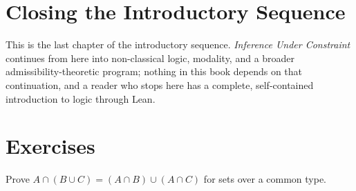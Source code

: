 \section{Closing the Introductory Sequence}

This is the last chapter of the introductory sequence.
\textit{Inference Under Constraint} continues from here into
non-classical logic, modality, and a broader admissibility-theoretic
program; nothing in this book depends on that continuation, and a
reader who stops here has a complete, self-contained introduction to
logic through Lean.

\section{Exercises}

\begin{exercise}
Prove $A \cap (B \cup C) = (A \cap B) \cup (A \cap C)$ for sets over a
common type.
\end{exercise}
